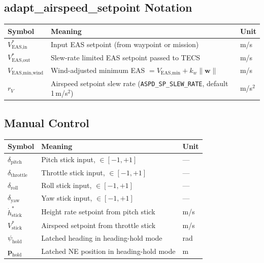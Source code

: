 \documentclass[12pt,a4paper]{article}
\begin{document}
\subsection*{adapt\_airspeed\_setpoint Notation}
\begin{center}\begin{tabular}{lll}\toprule
Symbol & Meaning & Unit \\\midrule
$V^*_{\text{EAS,in}}$ & Input EAS setpoint (from waypoint or mission) & m/s \\
$V^*_{\text{EAS,out}}$ & Slew-rate limited EAS setpoint passed to TECS & m/s \\
$V_{\text{EAS,min,wind}}$ & Wind-adjusted minimum EAS $= V_{\text{EAS,min}} + k_w\|\mathbf{w}\|$ & m/s \\
$r_V$ & Airspeed setpoint slew rate (\texttt{ASPD\_SP\_SLEW\_RATE}, default 1\,m/s$^2$) & m/s$^2$ \\
\bottomrule\end{tabular}\end{center}

\subsection*{Manual Control}
\begin{center}\begin{tabular}{lll}\toprule
Symbol & Meaning & Unit \\\midrule
$\delta_{\text{pitch}}$ & Pitch stick input, $\in[-1, +1]$ & --- \\
$\delta_{\text{throttle}}$ & Throttle stick input, $\in[-1, +1]$ & --- \\
$\delta_{\text{roll}}$ & Roll stick input, $\in[-1, +1]$ & --- \\
$\delta_{\text{yaw}}$ & Yaw stick input, $\in[-1, +1]$ & --- \\
$\dot{h}^*_{\text{stick}}$ & Height rate setpoint from pitch stick & m/s \\
$V^*_{\text{stick}}$ & Airspeed setpoint from throttle stick & m/s \\
$\psi_{\text{hold}}$ & Latched heading in heading-hold mode & rad \\
$\mathbf{p}_{\text{hold}}$ & Latched NE position in heading-hold mode & m \\
\bottomrule\end{tabular}\end{center}
\end{document}
